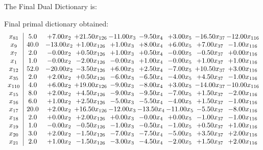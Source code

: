 \documentclass[8pt]{article}
\begin{document}
The Final Dual Dictionary is: 

 Final primal dictionary obtained: 
\[\begin{array}{c| c c@{\hskip 2pt} c@{\hskip 2pt} c@{\hskip 2pt} c@{\hskip 2pt} c@{\hskip 2pt} c@{\hskip 2pt} c@{\hskip 2pt} }
 x_{81}   &  5.0 & +  7.00 x_{2} & + 21.50 x_{126} & -11.00 x_{3} & -9.50 x_{4} & +  3.00 x_{5} & -16.50 x_{37} & -12.00 x_{116}\\
 x_{9}   &  40.0 & -13.00 x_{2} & +  1.00 x_{126} & +  1.00 x_{3} & +  8.00 x_{4} & +  6.00 x_{5} & +  7.00 x_{37} & -1.00 x_{116}\\
 x_{7}   &  2.0 & -0.00 x_{2} & +  0.50 x_{126} & +  1.00 x_{3} & +  0.50 x_{4} & -0.00 x_{5} & -0.50 x_{37} & +  0.00 x_{116}\\
 x_{1}   &  1.0 & -0.00 x_{2} & -2.00 x_{126} & -0.00 x_{3} & +  1.00 x_{4} & -0.00 x_{5} & +  1.00 x_{37} & +  1.00 x_{116}\\
 x_{12}   &  52.0 & -20.00 x_{2} & -3.50 x_{126} & +  6.00 x_{3} & +  2.50 x_{4} & -7.00 x_{5} & + 10.50 x_{37} & +  3.00 x_{116}\\
 x_{35}   &  2.0 & +  2.00 x_{2} & +  0.50 x_{126} & -6.00 x_{3} & -6.50 x_{4} & -4.00 x_{5} & +  4.50 x_{37} & -1.00 x_{116}\\
 x_{110}   &  4.0 & +  6.00 x_{2} & + 19.00 x_{126} & -9.00 x_{3} & -8.00 x_{4} & +  3.00 x_{5} & -14.00 x_{37} & -10.00 x_{116}\\
 x_{15}   &  8.0 & +  2.00 x_{2} & +  4.50 x_{126} & -9.00 x_{3} & -9.50 x_{4} & -7.00 x_{5} & +  1.50 x_{37} & -2.00 x_{116}\\
 x_{16}   &  6.0 & +  1.00 x_{2} & +  2.50 x_{126} & -5.00 x_{3} & -5.50 x_{4} & -4.00 x_{5} & +  1.50 x_{37} & -1.00 x_{116}\\
 x_{17}   &  20.0 & +  2.00 x_{2} & + 16.50 x_{126} & -12.00 x_{3} & -13.50 x_{4} & -11.00 x_{5} & -5.50 x_{37} & -8.00 x_{116}\\
 x_{18}   &  2.0 & +  0.00 x_{2} & +  2.00 x_{126} & +  0.00 x_{3} & -0.00 x_{4} & +  0.00 x_{5} & -1.00 x_{37} & -1.00 x_{116}\\
 x_{19}   &  1.0 & -0.00 x_{2} & -0.50 x_{126} & -1.00 x_{3} & -0.50 x_{4} & -1.00 x_{5} & +  0.50 x_{37} & +  1.00 x_{116}\\
 x_{20}   &  3.0 & +  2.00 x_{2} & -1.50 x_{126} & -7.00 x_{3} & -7.50 x_{4} & -5.00 x_{5} & +  3.50 x_{37} & +  2.00 x_{116}\\
 x_{21}   &  2.0 & +  1.00 x_{2} & -1.50 x_{126} & -3.00 x_{3} & -4.50 x_{4} & -2.00 x_{5} & +  1.50 x_{37} & +  2.00 x_{116}\\

\end{array}\]
\end{document}
